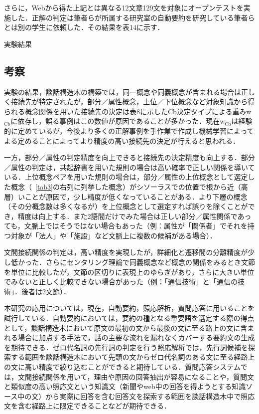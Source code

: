 \documentclass[japanese]{jnlp_1.4}
\begin{document}
さらに，Webから得た上記とは異なる12文章129文を対象にオープンテストを実施した．正解の判定は筆者らが所属する研究室の自動要約を研究している筆者らとは別の学生に依頼した．その結果を表14に示す．

\begin{table}[t]
\caption{実験結果}

\end{table}


\subsection{考察}

実験の結果，談話構造木の構築では，同一概念や同義概念が含まれる場合は正しく接続先が特定されたが，部分／属性概念，上位／下位概念など対象知識から得られる概念関係を用いた接続先の決定は表8に示したCb決定タイプによる重みw$_\mathrm{Cb}$に依存し，誤る事例はこの数値が原因であることが多かった．現在w$_\mathrm{Cb}$は経験的に定めているが，今後より多くの正解事例を手作業で作成し機械学習によってよる定めることによってより精度の高い接続先の決定が行えると思われる．

一方，部分／属性の判定精度を向上できると接続先の決定精度も向上する．部分／属性の判定は，共起辞書を用いた規則の場合は高い確率で正しい関係を導いている．上位概念ペアを用いた規則の場合は，部分／属性の上位概念として選定した概念（\tablename~\ref{tab3}の右列に列挙した概念）がシソーラスでの位置で根から近（高層）いことが原因で，少し精度が低くなっていることがある．より下層の概念（その分概念数は多くなるが）を上位概念として選定すれば誤りを除くことができ，精度は向上する．また2語間だけでみた場合は正しい部分／属性関係であっても，文脈上ではそうではない場合もあった（例：属性が「関係者」でそれを持つ対象が「法人」や「施設」など文脈上に複数の候補がある場合）．

文間接続関係の判定は，高い精度を実現したが，詳細化と遷移間の分離精度が少し低かった．さらにセンタリング理論で同義概念など概念の関係をみるとき文節を単位に比較したが，文節の区切りに表現上のゆらぎがあり，さらに大きい単位でみないと正しく比較できない場合があった（例：「通信技術」と「通信の技術」．後者は2文節）．

本研究の応用については，現在，自動要約，照応解析，質問応答に用いることを試行している．自動要約においては，要約の種となる重要語を選定する際の得点として，談話構造木において原文の最初の文から最後の文に至る路上の文に含まれる場合に加点する手法で，話の主要な流れを漏れなくカバーする要約文の生成を期待できる．ゼロ代名詞の先行詞の判定を行う照応解析では，先行詞候補を探索する範囲を談話構造木において先頭の文からゼロ代名詞のある文に至る経路上の文に高い精度で絞り込むことができると期待している．質問応答システムでは，文間接続関係を用いて，理由や原因の回答抽出が容易になることや，質問文と類似度の高い照応文という知識文（新聞やweb中の回答を得ようとする知識ソース中の文）から実際に回答を含む回答文を探索する範囲を談話構造木中で照応文を含む経路上に限定できることなどが期待できる．
\end{document}
